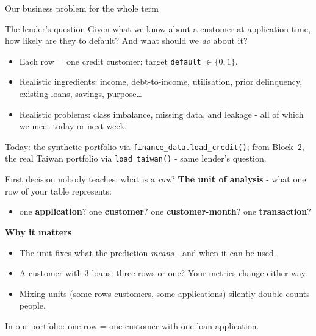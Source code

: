 \documentclass[10pt,aspectratio=169]{beamer}
\begin{document}
\begin{frame}{Our business problem for the whole term}
  \begin{block}{The lender's question}
    Given what we know about a customer at application time, how likely are they
    to \alert{default}? And what should we \emph{do} about it?
  \end{block}
  \begin{itemize}\small
    \item Each row = one credit customer; target \texttt{default} $\in \{0,1\}$.
    \item Realistic ingredients: income, debt-to-income, utilisation, prior
          delinquency, existing loans, savings, purpose\ldots
    \item Realistic problems: \alert{class imbalance}, \alert{missing data},
          and \alert{leakage} - all of which we meet today or next week.
  \end{itemize}
  \vspace{0.4em}
  \begin{center}\small Today: the synthetic portfolio via \texttt{finance\_data.load\_credit()};
  from Block~2, the real Taiwan portfolio via \texttt{load\_taiwan()} - same lender's question.\end{center}
\end{frame}

\begin{frame}{First decision nobody teaches: what is a \emph{row}?}
  \textbf{The unit of analysis} - what one row of your table represents:
  \begin{itemize}\small
    \item one \textbf{application}? \quad one \textbf{customer}? \quad one
          \textbf{customer-month}? \quad one \textbf{transaction}?
  \end{itemize}
  \vspace{0.5em}
  \textbf{Why it matters}
  \begin{itemize}\small
    \item The unit fixes what the prediction \emph{means} - and when it can be used.
    \item A customer with 3 loans: three rows or one? Your metrics change either way.
    \item Mixing units (some rows customers, some applications) silently
          \alert{double-counts} people.
  \end{itemize}
  \vspace{0.5em}
  \begin{center}
    In our portfolio: one row = one \alert{customer with one loan application}.
  \end{center}
\end{frame}
\end{document}
